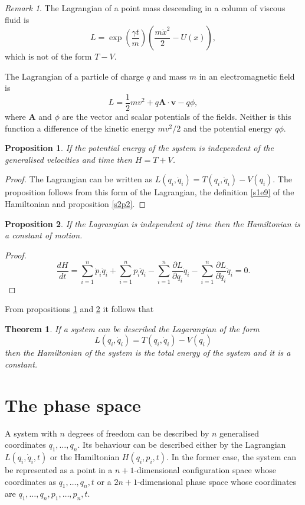 \documentclass{article}
\numberwithin{equation}{section}
\let\vec\bm
\theoremstyle{plain}
\newtheorem{thm}{Theorem}
\numberwithin{thm}{section}
\theoremstyle{plain}
\newtheorem{prop}{Proposition}
\numberwithin{prop}{section}
\theoremstyle{definition}
\numberwithin{defn}{section}
\theoremstyle{remark}
\newtheorem*{rem}{Remark}
\begin{document}
\begin{rem}
The Lagrangian of a point mass descending in a column of viscous fluid is
\begin{equation}\label{s2e6}
L = \exp\left(\frac{\gamma t}{m}\right)\left(\frac{m\dot{x}^2}{2} - U(x)\right),
\end{equation}
which is not of the form $T - V$. 

The Lagrangian of a particle of charge $q$ and mass $m$ in an electromagnetic
field is 
\begin{equation}\label{s2e7}
L = \frac{1}{2}mv^2 + q\vec{A}\cdot\vec{v} - q\phi,
\end{equation}
where $\vec{A}$ and $\phi$ are the vector and scalar potentials of the fields.
Neither is this function a difference of the kinetic energy $mv^2/2$ and 
the potential energy $q\phi$.
\end{rem}

\begin{prop}\label{s2p3}
If the potential energy of the system is independent of the generalised
velocities and time then $H = T + V$.
\end{prop}
\begin{proof}
The Lagrangian can be written as $L(q_i, \dot{q}_i) = T(q_i, \dot{q}_i)
- V(q_i)$. The proposition follows from this form of the Lagrangian, the
definition \eqref{s1e9} of the Hamiltonian and proposition \ref{s2p2}.
\end{proof}

\begin{prop}\label{s2p4}
If the Lagrangian is independent of time then the Hamiltonian is a constant
of motion.
\end{prop}
\begin{proof}
\[
\frac{dH}{dt} = \sum_{i=1}^n\dot{p}_i\dot{q}_i + \sum_{i=1}^np_i\ddot{q}_i
- \sum_{i=1}^n\frac{\partial L}{\partial q_i}\dot{q}_i 
- \sum_{i=1}^n\frac{\partial L}{\partial\dot{q}_i}\ddot{q}_i = 0.
\]
\end{proof}

From propositions \ref{s2p3} and \ref{s2p4} it follows that
\begin{thm}\label{s2t1}
If a system can be described the Lagarangian of the form
\[
L(q_i, \dot{q}_i) = T(q_i, \dot{q}_i) - V(q_i)
\]
then the Hamiltonian of the system is the total energy of the system and it
is a constant.
\end{thm}

\section{The phase space}\label{s3}
A system with $n$ degrees of freedom can be described by $n$ generalised
coordinates $q_1, \ldots, q_n$. Its behaviour can be described either by the
Lagrangian $L(q_i, \dot{q}_i, t)$ or the Hamiltonian $H(q_i, p_i, t)$. In
the former case, the system can be represented as a point in a 
$n+1$-dimensional configuration space whose coordinates as $q_1, \ldots, q_n, t$
or a $2n+1$-dimensional phase space whose coordinates are $q_1, \ldots, q_n,
p_1, \ldots, p_n, t$.
\end{document}

